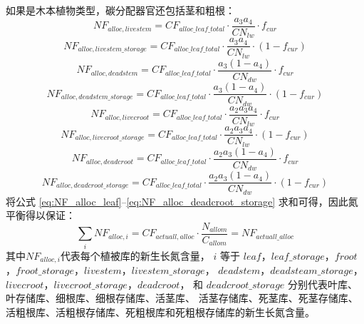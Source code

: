 如果是木本植物类型，碳分配器官还包括茎和粗根：
\begin{equation}
  NF_{alloc,livestem} = CF_{alloc\_leaf\_total}\cdot \frac{a_3a_4}{CN_{lw}}\cdot f_{cur}
\end{equation}
\begin{equation}
  NF_{alloc,livestem\_storage} = CF_{alloc\_leaf\_total}\cdot \frac{a_3a_4}{CN_{lw}}\cdot \left(1-f_{cur}\right)
\end{equation}
\begin{equation}
  NF_{alloc,deadstem} = CF_{alloc\_leaf\_total}\cdot \frac{a_3\left(1-a_4\right)}{CN_{dw}}\cdot f_{cur}
\end{equation}
\begin{equation}
  NF_{alloc,deadstem\_storage} = CF_{alloc\_leaf\_total}\cdot \frac{a_3\left(1-a_4\right)}{CN_{dw}}\cdot \left(1-f_{cur}\right)
\end{equation}
\begin{equation}
  NF_{alloc,livecroot} = CF_{alloc\_leaf\_total}\cdot \frac{a_2a_3a_4}{CN_{lw}}\cdot f_{cur}
\end{equation}
\begin{equation}
  NF_{alloc,livecroot\_storage} = CF_{alloc\_leaf\_total}\cdot \frac{a_2a_3a_4}{CN_{lw}}\cdot \left(1-f_{cur}\right)
\end{equation}
\begin{equation}
  NF_{alloc,deadcroot} = CF_{alloc\_leaf\_total}\cdot \frac{a_2a_3\left(1-a_4\right)}{CN_{dw}}\cdot f_{cur}
\end{equation}
\begin{equation}\label{eq:NF_alloc_deadcroot_storage}
  NF_{alloc,deadcroot\_storage} = CF_{alloc\_leaf\_total}\cdot \frac{a_2a_3\left(1-a_4\right)}{CN_{dw}}\cdot \left(1-f_{cur}\right)
\end{equation}
将公式 \eqref{eq:NF_alloc_leaf}--\eqref{eq:NF_alloc_deadcroot_storage} 求和可得，因此氮平衡得以保证：
\begin{equation}
  \sum_{i}{NF_{alloc,i}}=CF_{actuall,alloc}\cdot \frac{N_{allom}}{C_{allom}}=NF_{actuall\_alloc}
\end{equation}
其中$NF_{alloc,i}$代表每个植被库的新生长氮含量， 
$i$ 等于 $leaf$，$leaf\_storage$，$froot$，$froot\_storage$，$livestem$，$livestem\_storage$，
$deadstem$，$deadsteam\_storage$，$livecroot$，$livecroot\_storage$，$deadcroot$，
 和 $deadcroot\_storage$ 分别代表叶库、叶存储库、细根库、细根存储库、活茎库、
 活茎存储库、死茎库、死茎存储库、活粗根库、活粗根存储库、死粗根库和死粗根存储库的新生长氮含量。


